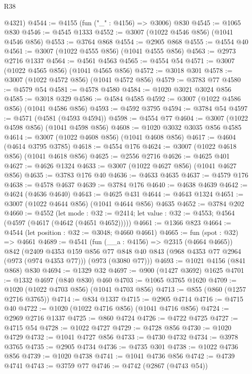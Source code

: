 \begin{lexlean}{R38}
\begin{coremodule}
      @4321)
@4544 := @4155 (fun ("_" : @4156) => @3006) @830
@4545 := @1065 @830
@4546 := @4545 @1333
@4552 := @3007 (@1022 @4546 @856) (@1041 @4546 @856)
@4553 := @3764 @868
@4554 := @2905 @868
@4555 := @4554 @40
@4561 := @3007 (@1022 @4555 @856) (@1041 @4555 @856)
@4563 := @2973 @2716 @1337
@4564 := @4561 @4563
@4565 := @4554 @54
@4571 := @3007 (@1022 @4565 @856) (@1041 @4565 @856)
@4572 := @3018 @301
@4578 := @3007 (@1022 @4572 @856) (@1041 @4572 @856)
@4579 := @3783 @77
@4580 := @4579 @54
@4581 := @4578 @4580
@4584 := @1020 @3021 @3024 @856
@4585 := @3018 @329
@4586 := @4584 @4585
@4592 := @3007 (@1022 @4586 @856) (@1041 @4586 @856)
@4593 := @4592 @3795
@4594 := @3784 @54
@4597 := @4571 (@4581 (@4593 @4594))
@4598 := @4554 @77
@4604 := @3007 (@1022 @4598 @856) (@1041 @4598 @856)
@4608 := @1020 @3032 @3035 @856 @4585
@4614 := @3007 (@1022 @4608 @856) (@1041 @4608 @856)
@4617 := @4604 (@4614 @3795 @3785)
@4618 := @4554 @176
@4624 := @3007 (@1022 @4618 @856) (@1041 @4618 @856)
@4625 := @2556 @2716
@4626 := @4625 @401
@4627 := @4626 @1324
@4633 := @3007 (@1022 @4627 @856) (@1041 @4627 @856)
@4635 := @3783 @176 @40
@4636 := @4633 @4635
@4637 := @4579 @176
@4638 := @4578 @4637
@4639 := @3784 @176
@4640 := @4638 @4639
@4642 := @4624 (@4636 @4640)
@4643 := @4625 @431
@4644 := @4643 @1324
@4651 := @3007 (@1022 @4644 @856) (@1041 @4644 @856) @4635
@4652 := @3784 @202
@4660 := @4552
    (let mode : @32 := @2414; let value : @32 := @4553; @4564 (@4597 (@4617 (@4642 (@4651 @4652)))))
@4661 := @1366 @823
@4664 := @4544 (let position : @32 := @3048; @4660 @4661)
@4665 := fun (spot : @32) => @4661
@4689 := @4541
    (fun (__a : @4156) => @2315 (@4664 @4665))
    @842
    (@2409
      @4353
      @159
      @856
      @77
      @848
      @40
      @843
      (@968 @4353 @77 @2964 (@973 (@974 @4353 @77)))
      (@973 (@3080 @77)))
@4693 := @1021 @4156 (@841 @868) @830
@4694 := @1329 @32
@4697 := @900 (@1427 @3692) @1625
@4701 := @1332 @4697 (@840 @830) @460
@4703 := @1065 @3765 @1620
@4709 := @1020 (@1022 @4703 @856) (@1041 @4703 @856)
@4713 := @855 (@860 (@1257 @2716 @3765))
@4714 := @834 @1337
@4715 := @2905 @4714
@4716 := @4715 @40
@4722 := @1020 (@1022 @4716 @856) (@1041 @4716 @856)
@4724 := @2969 @2716 @1337
@4725 := @860 @4724
@4726 := @4722 @4725
@4727 := @4715 @54
@4728 := @1022 @4727
@4729 := @4728 @856
@4730 := @1020 @4729
@4732 := @1041 @4727 @856
@4733 := @4730 @4732
@4734 := @3978 @3765
@4735 := @2905 @4734
@4736 := @4735 @301
@4738 := @1022 @4736 @856
@4739 := @1020 @4738
@4741 := @1041 @4736 @856
@4742 := @4739 @4741
@4743 := @3759 @77
@4746 := @4742 (@2867 (@4743 @54))

\end{coremodule}
\end{lexlean}
